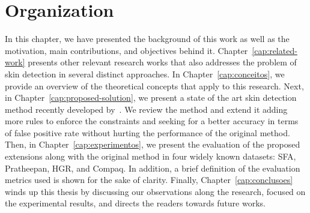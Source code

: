 \section{Organization}
\label{sec:text_organization}
In this chapter, we have presented the background of this work as well as the motivation, main contributions, and objectives behind it. Chapter~\ref{cap:related-work} presents other relevant research works that also addresses the problem of skin detection in several distinct approaches. In Chapter~\ref{cap:conceitos}, we provide an overview of the theoretical concepts that apply to this research. Next, in Chapter~\ref{cap:proposed-solution}, we present a state of the art skin detection method recently developed by~\citet{brancati:17}. We review the method and extend it adding more rules to enforce the constraints and seeking for a better accuracy in terms of false positive rate without hurting the performance of the original method. Then, in Chapter~\ref{cap:experimentos}, we present the evaluation of the proposed extensions along with the original method in four widely known datasets: SFA, Pratheepan, HGR, and Compaq. In addition, a brief definition of the evaluation metrics used is shown for the sake of clarity. Finally, Chapter~\ref{cap:conclusoes} winds up this thesis by discussing our observations along the research, focused on the experimental results, and directs the readers towards future works.